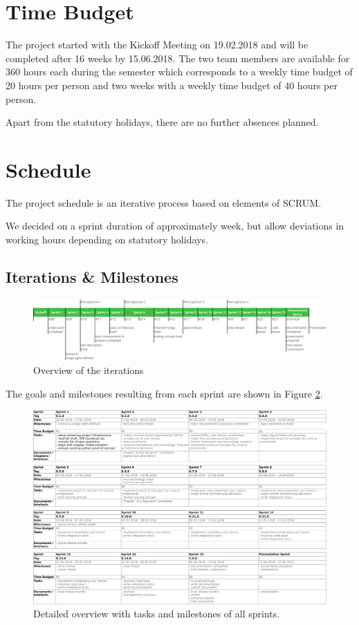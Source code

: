 \section{Time Budget}
The project started with the Kickoff Meeting on 19.02.2018 and will be completed after 16 weeks by 15.06.2018.
The two team members are available for 360 hours each during the semester which corresponds to a weekly time budget of 20 hours per person and two weeks with a weekly time budget of 40 hours per person.

Apart from the statutory holidays, there are no further absences planned.

\section{Schedule}
The project schedule is an iterative process based on elements of SCRUM.

We decided on a sprint duration of approximately week, but allow deviations in working hours depending on statutory holidays.

\subsection{Iterations \& Milestones}
\begin{figure}[h!]
    \centering
    \includegraphics[width=1\linewidth]{resources/overview}
    \caption{Overview of the iterations}
    \label{fig:overview}
\end{figure}

The goals and milestones resulting from each sprint are shown in Figure \ref{fig:sprint-details}.

\begin{figure}[h]
    \begin{sideways}
    \includegraphics[scale=0.75]{resources/sprint_details}
    \end{sideways}
    \centering
    \caption{Detailed overview with tasks and milestones of all sprints.}
    \label{fig:sprint-details}
\end{figure}



